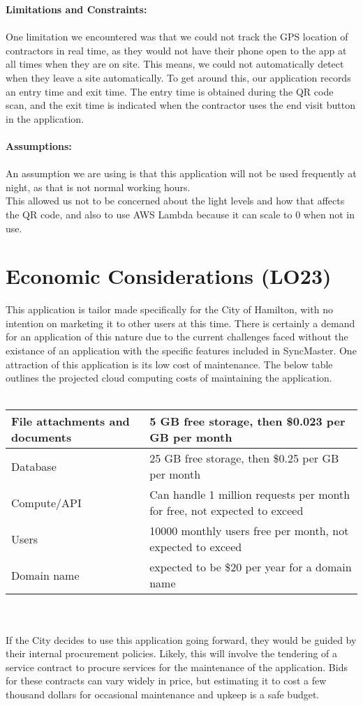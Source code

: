 \documentclass{article}
\begin{document}
\textbf{Limitations and Constraints:}\\
\\
One limitation we encountered was that we could not track the GPS location of contractors in real time, as they would not have
their phone open to the app at all times when they are on site. This means, we could not automatically detect when they leave a 
site automatically. To get around this, our application records an entry time and exit time. The entry time is obtained during
the QR code scan, and the exit time is indicated when the contractor uses the end visit button in the application.\\
\\
\textbf{Assumptions:}\\
\\
An assumption we are using is that this application will not be used frequently at night, as that is not normal working hours.\\
This allowed us not to be concerned about the light levels and how that affects the QR code, and also to use AWS Lambda because
it can scale to 0 when not in use.
\section{Economic Considerations (LO23)}
This application is tailor made specifically for the City of Hamilton, with no intention on marketing it to
other users at this time. There is certainly a demand for an application of this nature due to 
the current challenges faced without the existance of an application with the specific features
included in SyncMaster. One attraction of this application is its low cost of maintenance. The below table outlines the projected
cloud computing costs of maintaining the application.\\
\\
\begin{tabular}{|m{5cm}|m{5cm}|}
  \hline
  File attachments and documents & 5 GB free storage, then \$0.023 per GB per month\\
  \hline
  Database & 25 GB free storage, then \$0.25 per GB per month\\
  \hline
  Compute/API & Can handle 1 million requests per month for free, not expected to exceed\\
  \hline
  Users & 10000 monthly users free per month, not expected to exceed\\
  \hline
  Domain name & expected to be \$20 per year for a domain name\\
  \hline
\end{tabular}
\\
\\
If the City decides to use this application going forward, they would be guided by their internal procurement policies. Likely, this will involve the
tendering of a service contract to procure services for the maintenance of the application. Bids for these contracts can vary 
widely in price, but estimating it to cost a few thousand dollars for occasional maintenance and upkeep is a safe budget.
\end{document}
